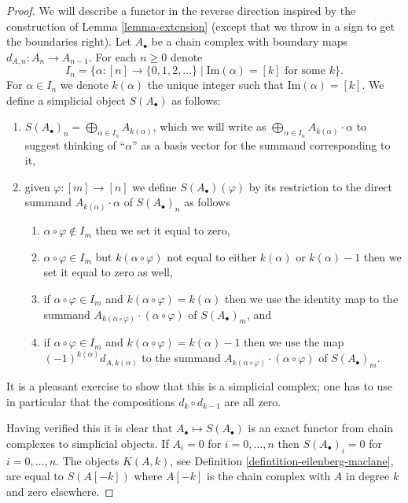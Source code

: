 \begin{proof}
We will describe a functor in the reverse direction
inspired by the construction of Lemma \ref{lemma-extension}
(except that we throw in a sign to get the boundaries
right). Let $A_\bullet$ be a chain complex with boundary maps
$d_{A,n} : A_n \to A_{n - 1}$. For each $n \geq 0$ denote
$$
I_n =
\Big\{
\alpha : [n] \to \{0, 1, 2, \ldots\}
\mid
\text{Im}(\alpha) = [k]\text{ for some }k
\Big\}.
$$
For $\alpha \in I_n$ we denote $k(\alpha)$ the unique
integer such that $\text{Im}(\alpha) = [k]$.
We define a simplicial object $S(A_\bullet)$ as follows:
\begin{enumerate}
\item $S(A_\bullet)_n = \bigoplus_{\alpha \in I_n} A_{k(\alpha)}$, which
we will write as
$\bigoplus_{\alpha \in I_n} A_{k(\alpha)} \cdot \alpha$
to suggest thinking of ``$\alpha$'' as a basis vector for the
summand corresponding to it,
\item given $\varphi : [m] \to [n]$ we define
$S(A_\bullet)(\varphi)$ by its restriction to
the direct summand $A_{k(\alpha)} \cdot \alpha$
of $S(A_\bullet)_n$ as follows
\begin{enumerate}
\item $\alpha \circ \varphi \not \in I_m$ then we set it equal to zero,
\item $\alpha \circ \varphi \in I_m$ but $k(\alpha \circ \varphi)$
not equal to either $k(\alpha)$ or $k(\alpha) - 1$ then we set it
equal to zero as well,
\item if $\alpha \circ \varphi \in I_m$
and $k(\alpha \circ \varphi) = k(\alpha)$ then we use
the identity map to the summand
$A_{k(\alpha \circ \varphi)} \cdot (\alpha \circ \varphi)$
of $S(A_\bullet)_m$, and
\item if $\alpha \circ \varphi \in I_m$
and $k(\alpha \circ \varphi) = k(\alpha) - 1$
then we use the map $(-1)^{k(\alpha)} d_{A, k(\alpha)}$ to the summand 
$A_{k(\alpha \circ \varphi)}\cdot (\alpha \circ \varphi)$
of $S(A_\bullet)_m$.
\end{enumerate}
\end{enumerate}
It is a pleasant exercise to show that
this is a simplicial complex; one has to use in particular that
the compositions $d_k \circ d_{k - 1}$ are all zero. 

\medskip\noindent
Having verified this it is clear that $A_\bullet \mapsto
S(A_\bullet)$ is an exact functor from chain complexes
to simplicial objects. If $A_i = 0$ for $i = 0, \ldots, n$
then $S(A_\bullet)_i = 0$ for $i = 0, \ldots, n$.
The objects $K(A, k)$, see Definition \ref{defintition-eilenberg-maclane},
are equal to $S(A[-k])$ where $A[-k]$ is the chain complex
with $A$ in degree $k$ and zero elsewhere.


\end{proof}
